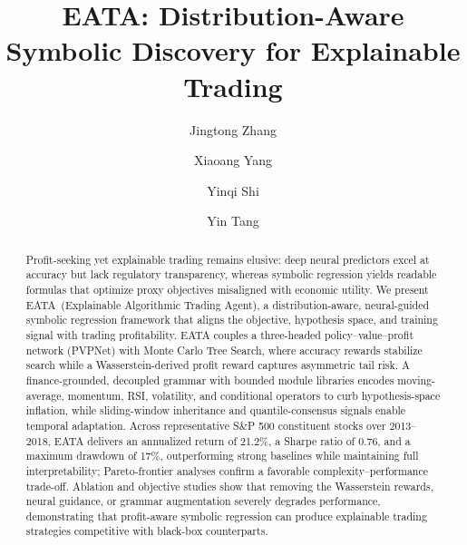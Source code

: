 \documentclass[final,5p]{elsarticle}
\newcommand{\ours}{EATA}
\newcommand{\ourslong}{Explainable Algorithmic Trading Agent}
\begin{document}
\begin{frontmatter}

\title{\ours: Distribution-Aware Symbolic Discovery for Explainable Trading}

\author [a]{Jingtong Zhang}
\author [b]{Xiaoang Yang}
\author [c]{Yinqi Shi}
\author [d]{Yin Tang}


\begin{abstract}
Profit-seeking yet explainable trading remains elusive: deep neural predictors excel at accuracy but lack regulatory transparency, whereas symbolic regression yields readable formulas that optimize proxy objectives misaligned with economic utility. We present \ours~\allowbreak(\ourslong), a distribution-aware, neural-guided symbolic regression framework that aligns the objective, hypothesis space, and training signal with trading profitability. \ours{} couples a three-headed policy--value--profit network (PVPNet) with Monte Carlo Tree Search, where accuracy rewards stabilize search while a Wasserstein-derived profit reward captures asymmetric tail risk. A finance-grounded, decoupled grammar with bounded module libraries encodes moving-average, momentum, RSI, volatility, and conditional operators to curb hypothesis-space inflation, while sliding-window inheritance and quantile-consensus signals enable temporal adaptation. Across representative S\&P 500 constituent stocks over 2013--2018, \ours{} delivers an annualized return of 21.2\%, a Sharpe ratio of 0.76, and a maximum drawdown of 17\%, outperforming strong baselines while maintaining full interpretability; Pareto-frontier analyses confirm a favorable complexity--performance trade-off. Ablation and objective studies show that removing the Wasserstein rewards, neural guidance, or grammar augmentation severely degrades performance, demonstrating that profit-aware symbolic regression can produce explainable trading strategies competitive with black-box counterparts.
\end{abstract}


\end{frontmatter}
\end{document}
